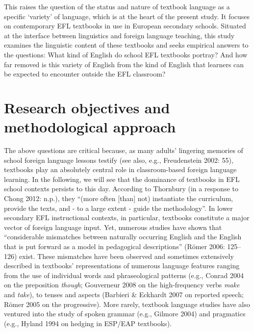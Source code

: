 \documentclass[
  letterpaper,
  DIV=11,
  numbers=noendperiod]{scrreprt}
\begin{document}
This raises the question of the status and nature of textbook language
as a specific `variety' of language, which is at the heart of the
present study. It focuses on contemporary EFL textbooks in use in
European secondary schools. Situated at the interface between
linguistics and foreign language teaching, this study examines the
linguistic content of these textbooks and seeks empirical answers to the
questions: What kind of English do school EFL textbooks portray? And how
far removed is this variety of English from the kind of English that
learners can be expected to encounter outside the EFL classroom?

\section{Research objectives and methodological
approach}\label{research-objectives-and-methodological-approach}

The above questions are critical because, as many adults' lingering
memories of school foreign language lessons testify (see also, e.g.,
Freudenstein 2002: 55), textbooks play an absolutely central role in
classroom-based foreign language learning. In the following, we will see
that the dominance of textbooks in EFL school contexts persists to this
day. According to Thornbury (in a response to Chong 2012: n.p.), they
``(more often {[}than{]} not) instantiate the curriculum, provide the
texts, and - to a large extent - guide the methodology''. In lower
secondary EFL instructional contexts, in particular, textbooks
constitute a major vector of foreign language input. Yet, numerous
studies have shown that ``considerable mismatches between naturally
occurring English and the English that is put forward as a model in
pedagogical descriptions'' (Römer 2006: 125--126) exist. These
mismatches have been observed and sometimes extensively described in
textbooks' representations of numerous language features ranging from
the use of individual words and phraseological patterns (e.g., Conrad
2004 on the preposition \emph{though}; Gouverneur 2008 on the
high-frequency verbs \emph{make} and \emph{take}), to tenses and aspects
(Barbieri \& Eckhardt 2007 on reported speech; Römer 2005 on the
progressive). More rarely, textbook language studies have also ventured
into the study of spoken grammar (e.g., Gilmore 2004) and pragmatics
(e.g., Hyland 1994 on hedging in ESP/EAP textbooks).
\end{document}
